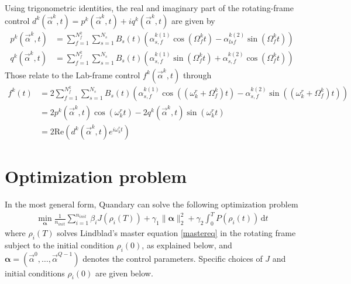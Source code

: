 \documentclass[11pt]{article}
\newcommand{\bfa}{\boldsymbol{\alpha}}
\begin{document}
Using trigonometric identities, the real and imaginary part of the rotating-frame control $d^k(\vec{\alpha}^k,t) = p^k(\vec{\alpha}^k,t) + iq^k(\vec{\alpha}^k,t)$ are given by
\begin{align}
  p^k(\vec{\alpha}^k,t) &= \sum_{f=1}^{N_f^k} \sum_{s=1}^{N_s} B_s(t)
  \left(\alpha^{k
  (1)}_{s,f} \cos(\Omega_f^k t) - \alpha^{k (2)}_{lsf} \sin(\Omega_f^k t)
  \right) \\
  q^k(\vec{\alpha}^k,t) &= \sum_{f=1}^{N_f^k} \sum_{s=1}^{N_s} B_s(t)\left( \alpha^{k
  (1)}_{s,f} \sin(\Omega_f^k t) + \alpha^{k (2)}_{s,f} \cos(\Omega_f^k t)
  \right)
\end{align}
Those relate to the Lab-frame control $f^k(\vec{\alpha}^k,t)$ through
\begin{align}
  f^k(t) &=  2\sum_{f=1}^{N_f^k} \sum_{s=1}^{N_s} B_s(t) \left(\alpha_{s,f}^{k(1)} \cos((\omega_k^{r} + \Omega_f^k) t) - \alpha_{s,f}^{k(2)}\sin((\omega_k^{r} + \Omega_f^k) t) \right) \\
         &= 2 p^k(\vec{\alpha}^k, t) \cos(\omega_k^{r} t) - 2 q^k(\vec{\alpha}^k,
         t)\sin(\omega_k^{r} t) \\
         &= 2\mbox{Re}\left( d^k(\vec{\alpha}^k,t)e^{i\omega_k^r t} \right)
\end{align}


\section{Optimization problem}
In the most general form, Quandary can solve the following optimization problem
\begin{align}
  \min_{\boldsymbol{\alpha}} \frac{1}{n_{init}} \sum_{i=1}^{n_{init}} \beta_i J(\rho_i(T))  + \gamma_1 \| \bfa \|^2_2 + \gamma_2 \int_0^T P\left(\rho_i(t)\right) \, \mathrm{d} t
\end{align}
where $\rho_i(T)$ solves Lindblad's master equation \eqref{mastereq} in the rotating frame subject to the initial condition $\rho_i(0)$, as explained below, and $\boldsymbol{\alpha} = \left(\vec{\alpha}^0, \dots, \vec{\alpha}^{Q-1}\right)$ denotes the control parameters. Specific choices of $J$ and initial conditions $\rho_i(0)$ are given below. 
\end{document}
